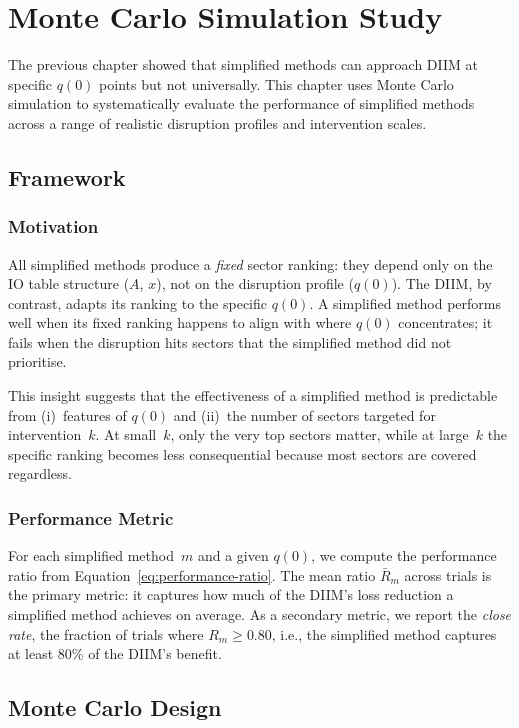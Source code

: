 \chapter{Monte Carlo Simulation Study}

The previous chapter showed that simplified methods can approach DIIM at specific $q(0)$ points but not universally. This chapter uses Monte Carlo simulation to systematically evaluate the performance of simplified methods across a range of realistic disruption profiles and intervention scales.

\section{Framework}

\subsection{Motivation}

All simplified methods produce a \emph{fixed} sector ranking: they depend only on the IO table structure ($A$, $x$), not on the disruption profile ($q(0)$). The DIIM, by contrast, adapts its ranking to the specific $q(0)$. A simplified method performs well when its fixed ranking happens to align with where $q(0)$ concentrates; it fails when the disruption hits sectors that the simplified method did not prioritise.

This insight suggests that the effectiveness of a simplified method is predictable from (i)~features of $q(0)$ and (ii)~the number of sectors targeted for intervention~$k$. At small~$k$, only the very top sectors matter, while at large~$k$ the specific ranking becomes less consequential because most sectors are covered regardless.

\subsection{Performance Metric}

For each simplified method~$m$ and a given $q(0)$, we compute the performance ratio from Equation~\eqref{eq:performance-ratio}. The mean ratio $\bar{R}_m$ across trials is the primary metric: it captures how much of the DIIM's loss reduction a simplified method achieves on average. As a secondary metric, we report the \emph{close rate}, the fraction of trials where $R_m \geq 0.80$, i.e., the simplified method captures at least 80\% of the DIIM's benefit.


\section{Monte Carlo Design}

